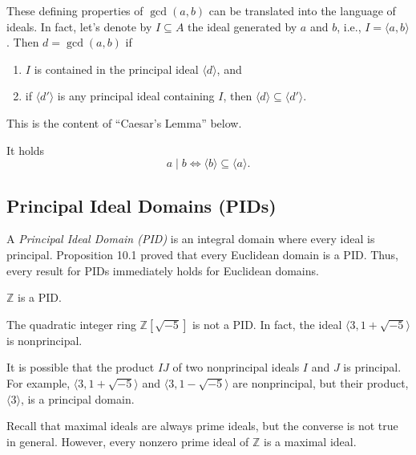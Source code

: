 \documentclass[11pt,a4paper]{article}
\begin{document}
\begin{rem}[10.1]
These defining properties of $\gcd(a, b)$ can be translated into the language of ideals. In fact, let's denote by $I \subseteq A$ the ideal generated by $a$ and $b$, i.e., $I = \langle a, b \rangle$. Then $d = \gcd(a, b)$ if
\begin{enumerate}[label=(\roman*)]
    \item $I$ is contained in the principal ideal $\langle d \rangle$, and
    \item if $\langle d' \rangle$ is any principal ideal containing $I$, then $\langle d \rangle \subseteq \langle d' \rangle$.
\end{enumerate}
\end{rem}

This is the content of “Caesar's Lemma” below.

\begin{lem}
It holds
\[
a \mid b \iff \langle b \rangle \subseteq \langle a \rangle.
\]
\end{lem}

\subsection{Principal Ideal Domains (PIDs)}

A \textit{Principal Ideal Domain (PID)} is an integral domain where every ideal is principal. Proposition 10.1 proved that every Euclidean domain is a PID. Thus, every result for PIDs immediately holds for Euclidean domains.

\begin{exa}[10.4]
$\mathbb{Z}$ is a PID.
\end{exa}

\begin{exa}[10.5]
The quadratic integer ring $\mathbb{Z}[\sqrt{-5}]$ is not a PID. In fact, the ideal $\langle 3, 1 + \sqrt{-5} \rangle$ is nonprincipal.
\end{exa}

\begin{rem}[10.2]
It is possible that the product $IJ$ of two nonprincipal ideals $I$ and $J$ is principal. For example, $\langle 3, 1 + \sqrt{-5} \rangle$ and $\langle 3, 1 - \sqrt{-5} \rangle$ are nonprincipal, but their product, $\langle 3 \rangle$, is a principal domain.
\end{rem}

Recall that maximal ideals are always prime ideals, but the converse is not true in general. However, every nonzero prime ideal of $\mathbb{Z}$ is a maximal ideal.
\end{document}
